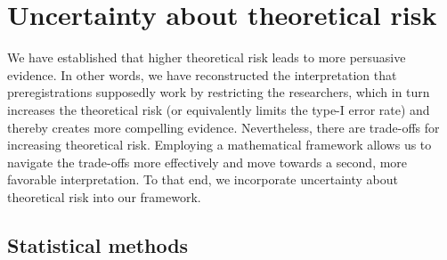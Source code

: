 \documentclass[jou,a4paper]{apa7}
\begin{document}
\section{Uncertainty about theoretical risk }

We have established that higher theoretical risk leads to more persuasive evidence.
In other words, we have reconstructed the interpretation that preregistrations supposedly work by restricting the researchers, which in turn increases the theoretical risk (or equivalently limits the type-I error rate) and thereby creates more compelling evidence.
Nevertheless, there are trade-offs for increasing theoretical risk.
Employing a mathematical framework allows us to navigate the trade-offs more effectively and move towards a second, more favorable interpretation.
To that end, we incorporate uncertainty about theoretical risk into our framework.

\subsection{Statistical methods}
\end{document}
